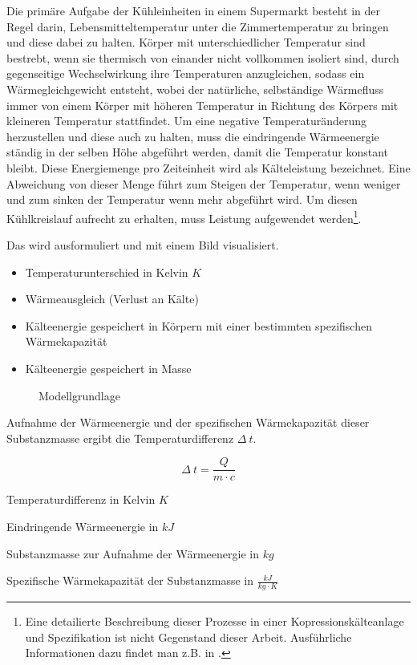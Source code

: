 Die primäre Aufgabe der Kühleinheiten in einem Supermarkt besteht in der Regel
darin, Lebensmitteltemperatur unter die Zimmertemperatur zu bringen und diese
dabei zu halten. Körper mit unterschiedlicher
Temperatur sind bestrebt, wenn sie thermisch von einander nicht vollkommen
isoliert sind, durch gegenseitige Wechselwirkung ihre Temperaturen anzugleichen,
sodass ein Wärmegleichgewicht entsteht, wobei der natürliche, selbständige
Wärmefluss immer von einem Körper mit höheren Temperatur in Richtung des Körpers
mit kleineren Temperatur stattfindet. Um eine negative Temperaturänderung
herzustellen und diese auch zu halten, muss die eindringende Wärmeenergie
ständig in der selben Höhe abgeführt werden, damit die Temperatur konstant
bleibt. Diese Energiemenge pro Zeiteinheit wird als Kälteleistung bezeichnet.
Eine Abweichung von dieser Menge führt zum Steigen der Temperatur, wenn weniger
und zum sinken der Temperatur wenn mehr abgeführt wird. Um diesen Kühlkreislauf
aufrecht zu erhalten, muss Leistung aufgewendet werden\footnote{ Eine
detailierte Beschreibung dieser Prozesse in einer Kopressionskälteanlage und
Spezifikation ist nicht Gegenstand dieser Arbeit.  Ausführliche Informationen
dazu findet man z.B.  in \cite{caro, doctor, TAB_A1}.}.

Das wird ausformuliert und mit einem Bild visualisiert.
\begin{itemize}
	\item Temperaturunterschied in Kelvin $K$
	\item Wärmeausgleich (Verlust an Kälte)
	\item Kälteenergie gespeichert in Körpern mit einer bestimmten
	spezifischen Wärmekapazität
	\item Kälteenergie gespeichert in Masse
\end{itemize}
\begin{figure}\caption{ Modellgrundlage}
\end{figure}

Aufnahme der Wärmeenergie und der spezifischen Wärmekapazität dieser
Substanzmasse ergibt die Temperaturdifferenz $\Delta\:t$.

\begin{equation}
	\Delta\:t = \frac{Q}{m\cdot c}
\label{tdif}
\end{equation}

\begin{description}[\dth]

	\item[$\Delta\:t$] Temperaturdifferenz in Kelvin $K$
	\item[$Q$] Eindringende Wärmeenergie in $kJ$
	\item[$m$] Substanzmasse zur Aufnahme der Wärmeenergie in $kg$
	\item[$c$] Spezifische Wärmekapazität der Substanzmasse in $\frac{kJ}{kg
		\cdot K}$

\end{description}
\vspace{0.5cm}


